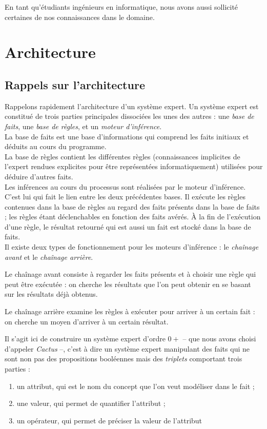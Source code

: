 \documentclass[a4paper,12pt]{article}
\begin{document}
	En tant qu'étudiants ingénieurs en informatique, nous avons aussi sollicité certaines de nos connaissances dans le domaine.

\section{Architecture}

\subsection{Rappels sur l'architecture}
Rappelons rapidement l'architecture d'un système expert.
Un système expert est constitué de trois parties principales dissociées les unes des autres : une \textit{base de faits}, une \textit{base de règles}, et un \textit{moteur d'inférence}.\\

La base de faits est une base d'informations qui comprend les faits initiaux et déduits au cours du programme.\\

La base de règles contient les différentes règles (connaissances implicites de l'expert rendues explicites pour être représentées informatiquement) utilisées pour déduire d'autres faits.\\

Les inférences au cours du processus sont réalisées par le moteur d'inférence. C'est lui qui fait le lien entre les deux précédentes bases. Il exécute les règles contenues dans la base de règles au regard des faits présents dans la base de faits ; les règles étant déclenchables en fonction des faits avérés. À la fin de l'exécution d'une règle, le résultat retourné qui est aussi un fait est stocké dans la base de faits.\\

Il existe deux types de fonctionnement pour les moteurs d'inférence : le \textit{chaînage avant} et le \textit{chaînage arrière}.

Le chaînage avant consiste à regarder les faits présents et à choisir une règle qui peut être exécutée : on cherche les résultats que l'on peut obtenir en se basant sur les résultats déjà obtenus.

Le chaînage arrière examine les règles à exécuter pour arriver à un certain fait : on cherche un moyen d'arriver à un certain résultat.


	Il s'agit ici de construire un système expert d'ordre $0+$ -- que nous avons choisi d'appeler \textit{Cactus} --, c'est à dire un système expert manipulant des faits qui ne sont non pas des propositions booléennes mais des \textit{triplets} comportant trois parties :
	\begin{enumerate}
		\item un attribut, qui est le nom du concept que l'on veut modéliser dans le fait ;
		\item une valeur, qui permet de quantifier l'attribut ;
		\item un opérateur, qui permet de préciser la valeur de l'attribut
	\end{enumerate}
	
\end{document}
